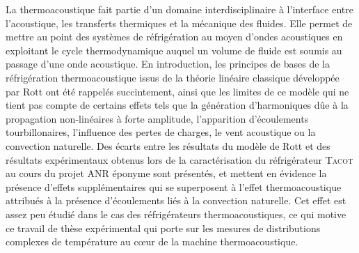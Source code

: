 %
La thermoacoustique fait partie d'un domaine interdisciplinaire à l'interface entre l'acoustique, les transferts thermiques et la mécanique des fluides. Elle permet de mettre au point des systèmes de réfrigération au moyen d'ondes acoustiques en exploitant le cycle thermodynamique auquel un volume de fluide est soumis au passage d'une onde acoustique. En introduction, les principes de bases de la réfrigération thermoacoustique issus de la théorie linéaire classique développée par Rott ont été rappelés succintement, ainsi que les limites de ce modèle qui ne tient pas compte de certains effets tels que la génération d'harmoniques dûe à la propagation non-linéaires à forte amplitude, l'apparition d'écoulements tourbillonaires, l'influence des pertes de charges, le vent acoustique ou la convection naturelle. Des écarts entre les résultats du modèle de Rott et des résultats expérimentaux obtenus lors de la caractérisation du réfrigérateur \textsc{Tacot} au cours du projet ANR éponyme sont présentés, et mettent en évidence la présence d'effets supplémentaires qui se superposent à l'effet thermoacoustique attribués à la présence d'écoulements liés à la convection naturelle. Cet effet est assez peu étudié dans le cas des réfrigérateurs thermoacoustiques, ce qui motive ce travail de thèse expérimental qui porte sur les mesures de distributions complexes de température au c\oe{}ur de la machine thermoacoustique.\medskip

